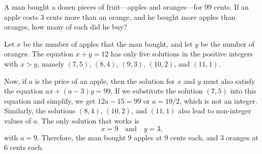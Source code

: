  A man bought a dozen pieces of fruit---apples and
oranges---for $99$ cents. If an apple costs $3$ cents more than an
orange, and he bought more apples than oranges, how many of each did
he buy?
\begin{solution}
  Let $x$ be the number of apples that the man bought, and let $y$ be
  the number of oranges. The equation $x + y = 12$ has only five
  solutions in the positive integers with $x > y$, namely $(7,5)$,
  $(8,4)$, $(9,3)$, $(10,2)$, and $(11,1)$.

  Now, if $a$ is the price of an apple, then the solution for $x$ and
  $y$ must also satisfy the equation $ax + (a-3)y = 99$. If we
  substitute the solution $(7,5)$ into this equation and simplify, we
  get $12a - 15 = 99$ or $a = 19/2$, which is not an
  integer. Similarly, the solutions $(8,4)$, $(10,2)$, and $(11,1)$
  also lead to non-integer values of $a$. The only solution that works
  is
  \begin{equation*}
    x = 9 \quad\text{and}\quad y = 3,
  \end{equation*}
  with $a = 9$. Therefore, the man bought $9$ apples at $9$ cents
  each, and $3$ oranges at $6$ cents each.
\end{solution}
